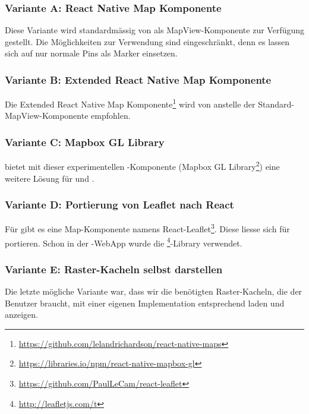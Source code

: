 \subsubsection{Variante A: React Native Map Komponente}
Diese Variante wird standardmässig von  als MapView-Komponente zur Verfügung gestellt. 
Die Möglichkeiten zur Verwendung sind eingeschränkt, denn es lassen sich auf  nur normale Pins als Marker einsetzen.\cite{react-native-mapview-pin}


\subsubsection{Variante B: Extended React Native Map Komponente}
Die Extended React Native Map Komponente\footnote{\url{https://github.com/lelandrichardson/react-native-maps}} wird von  anstelle der Standard-MapView-Komponente empfohlen.


\subsubsection{Variante C: Mapbox GL Library}
 bietet mit dieser experimentellen -Komponente (Mapbox GL Library\footnote{\url{https://libraries.io/npm/react-native-mapbox-gl}}) eine weitere Lösung für  und .


\subsubsection{Variante D: Portierung von Leaflet nach React}
Für  gibt es eine Map-Komponente namens React-Leaflet\footnote{\url{https://github.com/PaulLeCam/react-leaflet}}. 
Diese liesse sich für  portieren.
Schon in der \kort{}-\gls{WebApp} wurde die \footnote{\url{http://leafletjs.com/t}}-Library verwendet.


\subsubsection{Variante E: Raster-Kacheln selbst darstellen}
Die letzte mögliche Variante war, dass wir die benötigten Raster-Kacheln, die der Benutzer braucht, mit einer eigenen Implementation entsprechend laden und anzeigen.

